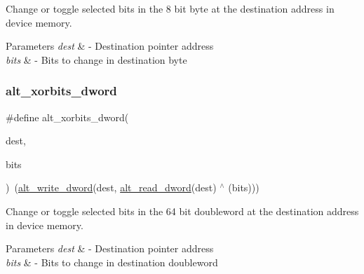 Change or toggle selected bits in the 8 bit byte at the destination address in device memory. 
\begin{DoxyParams}{Parameters}
{\em dest} & -\/ Destination pointer address \\
\hline
{\em bits} & -\/ Bits to change in destination byte \\
\hline
\end{DoxyParams}
\mbox{\label{group__ALT__SOCAL__UTIL__SC__FUNC_gaca89190166ce3b0277d53c55eaa1769b}} 
\subsubsection{\texorpdfstring{alt\_xorbits\_dword}{alt\_xorbits\_dword}}
{\footnotesize\ttfamily \#define alt\+\_\+xorbits\+\_\+dword(\begin{DoxyParamCaption}\item[{}]{dest,  }\item[{}]{bits }\end{DoxyParamCaption})~(\mbox{\hyperlink{group__ALT__SOCAL__UTIL__RW__FUNC_ga0fe80f8e5b6f3f09976dd35df49285e7}{alt\+\_\+write\+\_\+dword}}(dest, \mbox{\hyperlink{group__ALT__SOCAL__UTIL__RW__FUNC_gad66f5bf6cf73c5ba348a7ab118bcd2a0}{alt\+\_\+read\+\_\+dword}}(dest) $^\wedge$ (bits)))}

Change or toggle selected bits in the 64 bit doubleword at the destination address in device memory. 
\begin{DoxyParams}{Parameters}
{\em dest} & -\/ Destination pointer address \\
\hline
{\em bits} & -\/ Bits to change in destination doubleword \\
\hline
\end{DoxyParams}
\mbox{\label{group__ALT__SOCAL__UTIL__SC__FUNC_ga94d39bc81c0cec659847edc490249078}} 

